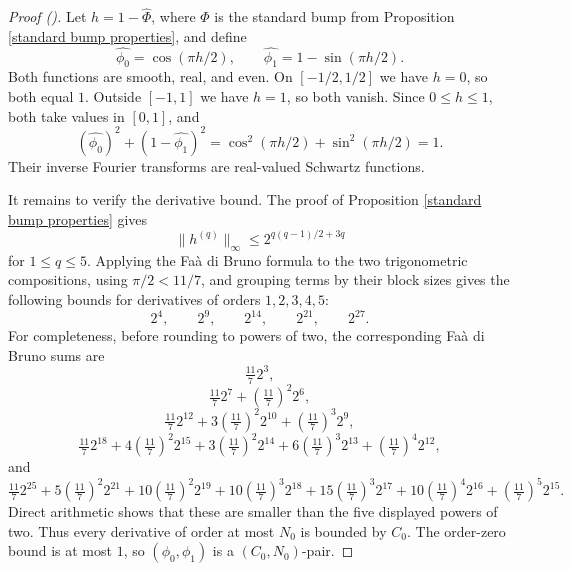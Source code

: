 \documentclass[12pt,reqno]{amsart}
\newcommand{\auto}{{({\tiny\faCar})}}
\theoremstyle{plain}
\numberwithin{equation}{section}
\theoremstyle{remark}
\begin{document}
\begin{proof}[Proof \auto]
Let $h=1-\widehat\Phi$, where $\Phi$ is the standard bump from Proposition \ref{standard bump properties}, and define
\[
\widehat{\phi_0}=\cos(\pi h/2),
\qquad
\widehat{\phi_1}=1-\sin(\pi h/2).
\]
Both functions are smooth, real, and even. On $[-1/2,1/2]$ we have $h=0$, so both equal $1$. Outside $[-1,1]$ we have $h=1$, so both vanish. Since $0\le h\le1$, both take values in $[0,1]$, and
\[
(\widehat{\phi_0})^2+(1-\widehat{\phi_1})^2
=\cos^2(\pi h/2)+\sin^2(\pi h/2)=1.
\]
Their inverse Fourier transforms are real-valued Schwartz functions.

It remains to verify the derivative bound. The proof of Proposition \ref{standard bump properties} gives
\[
\|h^{(q)}\|_\infty
\le2^{q(q-1)/2+3q}
\]
for $1\le q\le5$. Applying the Fa\`a di Bruno formula to the two trigonometric compositions, using $\pi/2<11/7$, and grouping terms by their block sizes gives the following bounds for derivatives of orders $1,2,3,4,5$:
\[
2^4,
\qquad
2^9,
\qquad
2^{14},
\qquad
2^{21},
\qquad
2^{27}.
\]
For completeness, before rounding to powers of two, the corresponding Fa\`a di Bruno sums are
\[
\tfrac{11}{7}2^3,
\]
\[
\tfrac{11}{7}2^7+\left(\tfrac{11}{7}\right)^2 2^6,
\]
\[
\tfrac{11}{7}2^{12}+3\left(\tfrac{11}{7}\right)^2 2^{10}+\left(\tfrac{11}{7}\right)^3 2^9,
\]
\[
\tfrac{11}{7}2^{18}+4\left(\tfrac{11}{7}\right)^2 2^{15}+3\left(\tfrac{11}{7}\right)^2 2^{14}+6\left(\tfrac{11}{7}\right)^3 2^{13}+\left(\tfrac{11}{7}\right)^4 2^{12},
\]
and
\[
\tfrac{11}{7}2^{25}+5\left(\tfrac{11}{7}\right)^2 2^{21}+10\left(\tfrac{11}{7}\right)^2 2^{19}+10\left(\tfrac{11}{7}\right)^3 2^{18}+15\left(\tfrac{11}{7}\right)^3 2^{17}+10\left(\tfrac{11}{7}\right)^4 2^{16}+\left(\tfrac{11}{7}\right)^5 2^{15}.
\]
Direct arithmetic shows that these are smaller than the five displayed powers of two. Thus every derivative of order at most $N_0$ is bounded by $C_0$. The order-zero bound is at most $1$, so $(\phi_0,\phi_1)$ is a $(C_0,N_0)$-pair.
\end{proof}
\end{document}
